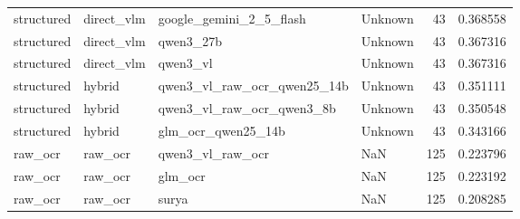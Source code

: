 \begin{tabular}{llllrr}
structured & direct\_vlm & google\_gemini\_2\_5\_flash & Unknown & 43 & 0.368558 \\
structured & direct\_vlm & qwen3\_27b & Unknown & 43 & 0.367316 \\
structured & direct\_vlm & qwen3\_vl & Unknown & 43 & 0.367316 \\
structured & hybrid & qwen3\_vl\_raw\_ocr\_qwen25\_14b & Unknown & 43 & 0.351111 \\
structured & hybrid & qwen3\_vl\_raw\_ocr\_qwen3\_8b & Unknown & 43 & 0.350548 \\
structured & hybrid & glm\_ocr\_qwen25\_14b & Unknown & 43 & 0.343166 \\
raw\_ocr & raw\_ocr & qwen3\_vl\_raw\_ocr & NaN & 125 & 0.223796 \\
raw\_ocr & raw\_ocr & glm\_ocr & NaN & 125 & 0.223192 \\
raw\_ocr & raw\_ocr & surya & NaN & 125 & 0.208285 \\
\bottomrule
\end{tabular}
